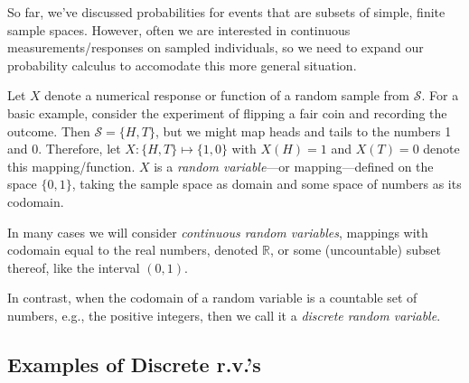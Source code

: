 \documentclass[]{book}
\begin{document}
So far, we've discussed probabilities for events that are subsets of
simple, finite sample spaces. However, often we are interested in
continuous measurements/responses on sampled individuals, so we need to
expand our probability calculus to accomodate this more general
situation.

Let \(X\) denote a numerical response or function of a random sample
from \(\mathcal{S}\). For a basic example, consider the experiment of
flipping a fair coin and recording the outcome. Then
\(\mathcal{S} = \{H, T\}\), but we might map heads and tails to the
numbers 1 and 0. Therefore, let \(X:\{H,T\}\mapsto \{1,0\}\) with
\(X(H) = 1\) and \(X(T) = 0\) denote this mapping/function. \(X\) is a
\emph{random variable}---or mapping---defined on the space \(\{0,1\}\),
taking the sample space as domain and some space of numbers as its
codomain.

In many cases we will consider \emph{continuous random variables},
mappings with codomain equal to the real numbers, denoted
\(\mathbb{R}\), or some (uncountable) subset thereof, like the interval
\((0,1)\).

In contrast, when the codomain of a random variable is a countable set
of numbers, e.g., the positive integers, then we call it a
\emph{discrete random variable}.

\subsection{Examples of Discrete
r.v.'s}\label{examples-of-discrete-r.v.s}
\end{document}

